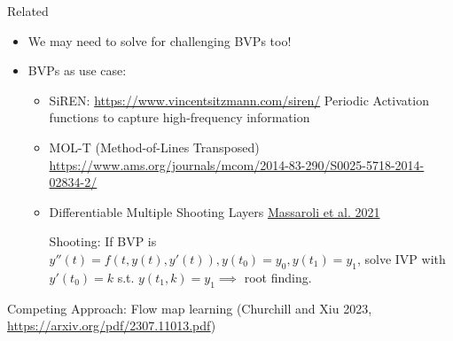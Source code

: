 \documentclass[usenames,dvipsnames]{beamer}
\theoremstyle{definition}
\begin{document}
\begin{frame}{Related}
    \begin{itemize}
        \item We may need to solve for challenging BVPs too!
        
        \item BVPs as use case:
        \begin{itemize}
            \item SiREN: \url{https://www.vincentsitzmann.com/siren/}
            Periodic Activation functions to capture high-frequency information

            \item MOL-T (Method-of-Lines Transposed) \url{https://www.ams.org/journals/mcom/2014-83-290/S0025-5718-2014-02834-2/}

            \item Differentiable Multiple Shooting Layers \href{www.arxiv.org/abs/2106.03885}{Massaroli et al. 2021}
            
            Shooting: If BVP is $y''(t) = f(t, y(t), y'(t)), y(t_0)= y_0, y(t_1) = y_1$, solve IVP with $y'(t_0)=k$ s.t. $y(t_1, k) = y_1 \implies $ root finding.
        \end{itemize}
    \end{itemize}

    Competing Approach: Flow map learning (Churchill and Xiu 2023, \url{https://arxiv.org/pdf/2307.11013.pdf})
    
\end{frame}







\end{document}
